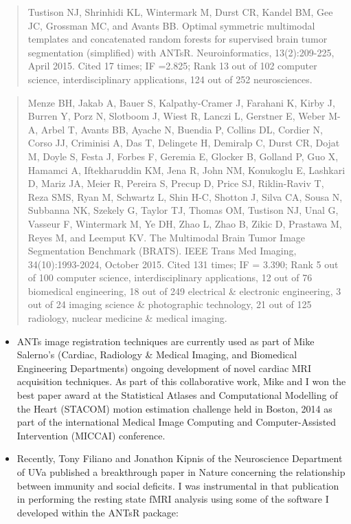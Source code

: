 \documentclass[11pt,]{article}
\begin{document}
\begin{itemize}
  \begin{quote}
  Tustison NJ, Shrinhidi KL, Wintermark M, Durst CR, Kandel BM, Gee JC,
  Grossman MC, and Avants BB. Optimal symmetric multimodal templates and
  concatenated random forests for supervised brain tumor segmentation
  (simplified) with ANTsR. Neuroinformatics, 13(2):209-225, April 2015.
  Cited 17 times; IF =2.825; Rank 13 out of 102 computer science,
  interdisciplinary applications, 124 out of 252 neurosciences.
  \end{quote}

  \begin{quote}
  Menze BH, Jakab A, Bauer S, Kalpathy-Cramer J, Farahani K, Kirby J,
  Burren Y, Porz N, Slotboom J, Wiest R, Lanczi L, Gerstner E, Weber
  M-A, Arbel T, Avants BB, Ayache N, Buendia P, Collins DL, Cordier N,
  Corso JJ, Criminisi A, Das T, Delingete H, Demiralp C, Durst CR, Dojat
  M, Doyle S, Festa J, Forbes F, Geremia E, Glocker B, Golland P, Guo X,
  Hamamci A, Iftekharuddin KM, Jena R, John NM, Konukoglu E, Lashkari D,
  Mariz JA, Meier R, Pereira S, Precup D, Price SJ, Riklin-Raviv T, Reza
  SMS, Ryan M, Schwartz L, Shin H-C, Shotton J, Silva CA, Sousa N,
  Subbanna NK, Szekely G, Taylor TJ, Thomas OM, Tustison NJ, Unal G,
  Vasseur F, Wintermark M, Ye DH, Zhao L, Zhao B, Zikic D, Prastawa M,
  Reyes M, and Leemput KV. The Multimodal Brain Tumor Image Segmentation
  Benchmark (BRATS). IEEE Trans Med Imaging, 34(10):1993-2024, October
  2015. Cited 131 times; IF = 3.390; Rank 5 out of 100 computer science,
  interdisciplinary applications, 12 out of 76 biomedical engineering,
  18 out of 249 electrical \& electronic engineering, 3 out of 24
  imaging science \& photographic technology, 21 out of 125 radiology,
  nuclear medicine \& medical imaging.
  \end{quote}

  \begin{itemize}
  \item
    ANTs image registration techniques are currently used as part of
    Mike Salerno's (Cardiac, Radiology \& Medical Imaging, and
    Biomedical Engineering Departments) ongoing development of novel
    cardiac MRI acquisition techniques. As part of this collaborative
    work, Mike and I won the best paper award at the Statistical Atlases
    and Computational Modelling of the Heart (STACOM) motion estimation
    challenge held in Boston, 2014 as part of the international Medical
    Image Computing and Computer-Assisted Intervention (MICCAI)
    conference.
  \item
    Recently, Tony Filiano and Jonathon Kipnis of the Neuroscience
    Department of UVa published a breakthrough paper in Nature
    concerning the relationship between immunity and social deficits. I
    was instrumental in that publication in performing the resting state
    fMRI analysis using some of the software I developed within the
    ANTsR package:
  \end{itemize}


\end{itemize}
\end{document}
